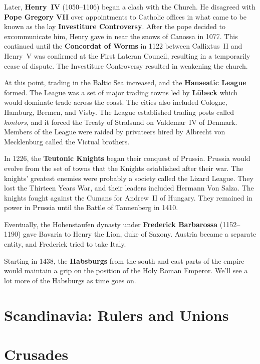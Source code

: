 Later, \textbf{Henry~IV} (1050--1106) began a clash with the Church.
He disagreed with \textbf{Pope Gregory VII} over appointments to Catholic offices
in what came to be known as the lay \textbf{Investiture Controversy}.
After the pope decided to excommunicate him, Henry gave in near the snows of Canossa in 1077.
This continued until the \textbf{Concordat of Worms} in 1122 between Callixtus~II and Henry~V
was confirmed at the First Lateran Council,
resulting in a temporarily cease of dispute.
The Investiture Controversy resulted in weakening the church.

At this point, trading in the Baltic Sea increased, and the \textbf{Hanseatic League} formed.
The League was a set of major trading towns led by \textbf{L\"ubeck} which would dominate trade across the coast.
The cities also included Cologne, Hamburg, Bremen, and Visby.
The League established trading posts called \textit{kontors},
and it forced the Treaty of Stralsund on Valdemar~IV of Denmark.
Members of the League were raided by privateers hired by Albrecht von Mecklenburg called the Victual brothers.

In 1226, the \textbf{Teutonic Knights} began their conquest of Prussia.
Prussia would evolve from the set of towns that the Knights established after their war.
The knights' greatest enemies were probably a society called the Lizard League.
They lost the Thirteen Years War, and their leaders included Hermann Von Salza.
The knights fought against the Cumans for Andrew~II of Hungary.
They remained in power in Prussia until the Battle of Tannenberg in 1410.

Eventually, the Hohenstaufen dynasty under \textbf{Frederick Barbarossa} (1152--1190)
gave Bavaria to Henry the Lion, duke of Saxony.
Austria became a separate entity, and Frederick tried to take Italy.

Starting in 1438, the \textbf{Habsburgs} from the south and east parts of the empire
would maintain a grip on the position of the Holy Roman Emperor.
We'll see a lot more of the Habsburgs as time goes on.

\section{Scandinavia: Rulers and Unions}

\section{Crusades}


